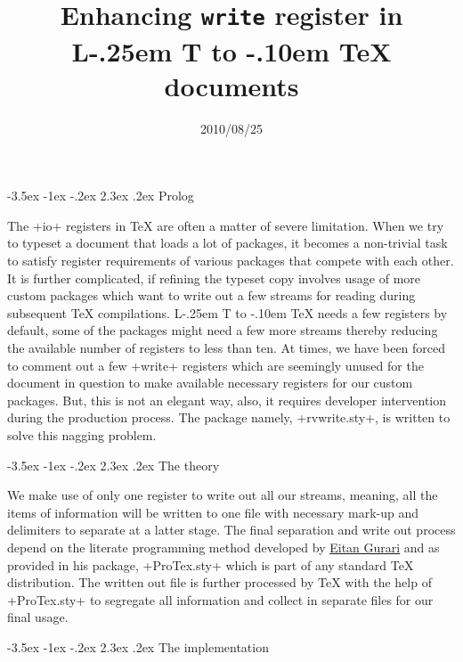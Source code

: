 \documentclass[a4paper]{article}
\makeatletter
\DeclareRobustCommand{\LaTeX}{L\kern-.25em%
  {\sbox\z@ T%
         \vbox to\ht\z@{%
           \hbox{%
             \check@mathfonts
              \fontsize\sf@size\z@
              \math@fontsfalse\selectfont
              A}%
          \vss}%
        }%
   \kern-.10em%
   \TeX}
\def\xml{\textsc{xml}\xspace}
\def\pdf{\textsc{pdf}\xspace}
\def\section{\@startsection {section}{1}{\z@}%
      {-3.5ex \@plus -1ex \@minus -.2ex}%
      {2.3ex \@plus.2ex}%
      {\normalfont\large\bfseries\color{seccolor}}}
\def\version#1{\gdef\@version{#1}}
\def\@version{1.0}
\def\contact#1{\gdef\@contact{#1}}
\def\author#1{\gdef\@author{#1}}
\def\@author{River Valley Technologies}
\def\@contact{\texttt{support@river-valley.com}}
\def\keywords#1{\gdef\@keywords{#1}}
\def\@keywords{\LaTeX, \xml}
\def\verbatim@font{\normalfont\color{verbcolor}\ttfamily}
\def\verb{\relax\ifmmode\hbox\else\leavevmode\null\fi
  \bgroup
    \verb@eol@error \let\do\@makeother \dospecials
    \verbatim@font\@noligs
    \@ifstar\@sverb\@verb}
\makeatother
\begin{document}
\title{Enhancing \texttt{write} register in \LaTeX{} documents}
\date{2010/08/25}
\version{1.2}
\keywords{\pdf, pdf\TeX, \LaTeX}
\author{c.\,v.\,radhakrishnan}
\contact{\texttt{cvr@river-valley.org}}

\maketitle

\section{Prolog}

The \verb+io+ registers in \TeX{} are often a matter of severe
limitation. When we try to typeset a document that loads a lot of
packages, it becomes a non-trivial task to satisfy register
requirements of various packages that compete with each other. It is
further complicated, if refining the typeset copy involves usage of
more custom packages which want to write out a few streams for reading
during subsequent \TeX{} compilations. \LaTeX{} needs a few registers
by default, some of the packages might need a few more streams thereby
reducing the available number of registers to less than ten. At times,
we have been forced to comment out a few \verb+write+ registers which
are seemingly unused for the document in question to make available
necessary registers for our custom packages. But, this is not an
elegant way, also, it requires developer intervention during the
production process. The package namely, \verb+rvwrite.sty+, is written
to solve this nagging problem.

\section{The theory}

We make use of only one register to write out all our streams,
meaning, all the items of information will be written to one file with
necessary mark-up and delimiters to separate at a latter stage. The
final separation and write out process depend on the literate
programming method developed by
\href{http://tug.org/interviews/gurari.pdf}{Eitan Gurari} and as
provided in his package, \verb+ProTex.sty+ which is part of any
standard \TeX{} distribution. The written out file is further
processed by \TeX{} with the help of \verb+ProTex.sty+ to segregate
all information and collect in separate files for our final usage.

\section{The implementation}
\end{document}
